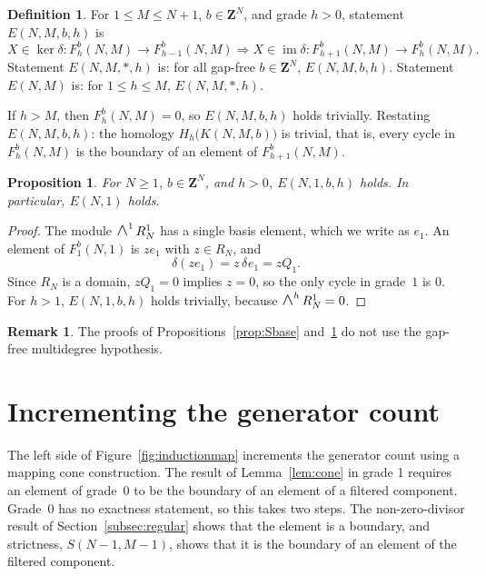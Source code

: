 \documentclass[12pt]{amsart}
\newtheorem{proposition}[theorem]{Proposition}
\theoremstyle{definition}
\newtheorem{definition1}[theorem]{Definition}
\newtheorem{remark1}[theorem]{Remark}
\theoremstyle{remark}
\newcommand{\Z}{\mathbf Z}
\DeclareMathOperator{\im}{im}
\newcommand{\WedgeAux}[2]{\scalebox{1.35}{$#1\wedge$}}
\newcommand{\Wedge}{\mathop{\mathpalette\WedgeAux\relax}\nolimits}
\begin{document}
\begin{definition1}
For $1 \leq M \leq N+1$, $b \in \Z^N$, and grade $h > 0$,
statement $E(N, M, b, h)$ is
\begin{equation}\label{eq:statementE}
X \in \ker \delta: F^b_h(N, M)\rightarrow F^b_{h-1}(N, M)
\Rightarrow X \in \im \delta: F^b_{h+1}(N, M) \rightarrow F^b_h(N, M).
\end{equation}
Statement $E(N, M, *, h)$ is: for all gap-free $b\in \Z^N$, $E(N, M, b, h)$.
Statement $E(N, M)$ is: for $1 \leq h \leq M$, $E(N, M, *, h)$.
\end{definition1}
If $h>M$, then $F^b_h(N, M)=0$, so $E(N, M, b, h)$ holds trivially.
Restating $E(N, M, b, h)$: the homology $H_h\bigl(K(N, M, b)\bigr)$ is trivial,
that is, every cycle in $F^b_{h}(N, M)$ is the boundary of an element of
$F^b_{h+1}(N, M)$.
\begin{proposition}\label{prop:Ebase}
For $N\geq 1$, $b \in \Z^N$, and $h > 0$, $E(N, 1, b, h)$ holds.  In particular, $E(N, 1)$ holds.
\end{proposition}
\begin{proof}
The module $\Wedge^1 R_N^1$ has a single basis element, which we write as $e_1$.
An element of $F^b_1(N, 1)$ is $z e_1$ with $z\in R_N$, and
  \[ \delta(z e_1) =  z\, \delta\mspace{1mu} e_1= z Q_1. \]
  Since $R_N$ is a domain, $z Q_1 = 0$ implies $z = 0$, so the only cycle in grade~$1$ is $0$.
For $h > 1$, $E(N, 1, b, h)$ holds trivially, because $\Wedge^h R^1_N = 0$.
\end{proof}
\begin{remark1}
  The proofs of Propositions~\ref{prop:Sbase} and~\ref{prop:Ebase} do
  not use the gap-free multidegree hypothesis.
\end{remark1}




\section{Incrementing the generator count}\label{sec:generators}

The left side of Figure~\ref{fig:inductionmap}
increments the generator count using a mapping cone construction.
The result of Lemma~\ref{lem:cone} in grade 1 requires an element of
grade~$0$ to be the boundary of an element of a filtered component.
Grade~$0$ has no exactness statement, so this takes two steps.
The non-zero-divisor result of Section~\ref{subsec:regular} shows that
the element is a boundary, and strictness, $S(N-1,M-1)$, shows that it
is the boundary of an element of the filtered component.
\end{document}
